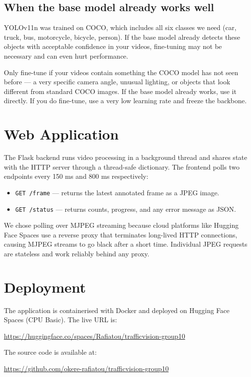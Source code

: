 \documentclass[12pt,a4paper,leqno]{report}
\begin{document}
\subsection{When the base model already works well}

YOLOv11n was trained on COCO, which includes all six classes we need (car, truck, bus, motorcycle, bicycle, person). If the base model already detects these objects with acceptable confidence in your videos, fine-tuning may not be necessary and can even hurt performance.

\begin{infobox}
Only fine-tune if your videos contain something the COCO model has not seen before — a very specific camera angle, unusual lighting, or objects that look different from standard COCO images. If the base model already works, use it directly. If you do fine-tune, use a very low learning rate and freeze the backbone.
\end{infobox}

\section{Web Application}

The Flask backend runs video processing in a background thread and shares state with the HTTP server through a thread-safe dictionary. The frontend polls two endpoints every 150 ms and 800 ms respectively:

\begin{itemize}
  \item \texttt{GET /frame} — returns the latest annotated frame as a JPEG image.
  \item \texttt{GET /status} — returns counts, progress, and any error message as JSON.
\end{itemize}

We chose polling over MJPEG streaming because cloud platforms like Hugging Face Spaces use a reverse proxy that terminates long-lived HTTP connections, causing MJPEG streams to go black after a short time. Individual JPEG requests are stateless and work reliably behind any proxy.

\section{Deployment}

The application is containerised with Docker and deployed on Hugging Face Spaces (CPU Basic). The live URL is:
\begin{center}
  \url{https://huggingface.co/spaces/Rafiatou/trafficvision-group10}
\end{center}
The source code is available at:
\begin{center}
  \url{https://github.com/okere-rafiatou/trafficvision-group10}
\end{center}
\end{document}
